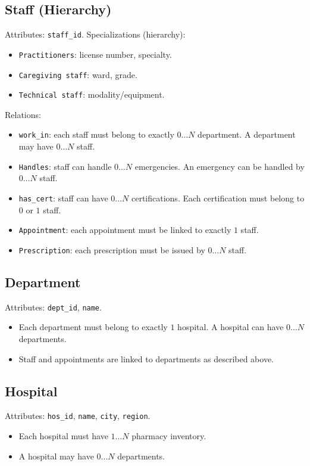 \documentclass[a4paper,12pt]{article}
\begin{document}
\subsection*{Staff (Hierarchy)}
Attributes: \texttt{staff\_id}.  
Specializations (hierarchy):
\begin{itemize}
    \item \texttt{Practitioners}: license number, specialty.
    \item \texttt{Caregiving staff}: ward, grade.
    \item \texttt{Technical staff}: modality/equipment.
\end{itemize}

Relations:
\begin{itemize}
    \item \texttt{work\_in}: each staff must belong to exactly $0\dots N$ department. A department may have $0\dots N$ staff.
    \item \texttt{Handles}: staff can handle $0\dots N$ emergencies. An emergency can be handled by $0\dots N$ staff.
    \item \texttt{has\_cert}: staff can have $0\dots N$ certifications. Each certification must belong to $0$ or $1$ staff.
    \item \texttt{Appointment}: each appointment must be linked to exactly $1$ staff.
    \item \texttt{Prescription}: each prescription must be issued by $0\dots N$ staff.
\end{itemize}

\subsection*{Department}
Attributes: \texttt{dept\_id}, \texttt{name}.  
\begin{itemize}
    \item Each department must belong to exactly $1$ hospital. A hospital can have $0\dots N$ departments.
    \item Staff and appointments are linked to departments as described above.
\end{itemize}

\subsection*{Hospital}
Attributes: \texttt{hos\_id}, \texttt{name}, \texttt{city}, \texttt{region}.  
\begin{itemize}
    \item Each hospital must have $1\dots N$ pharmacy inventory.
    \item A hospital may have $0\dots N$ departments.
\end{itemize}
\end{document}
